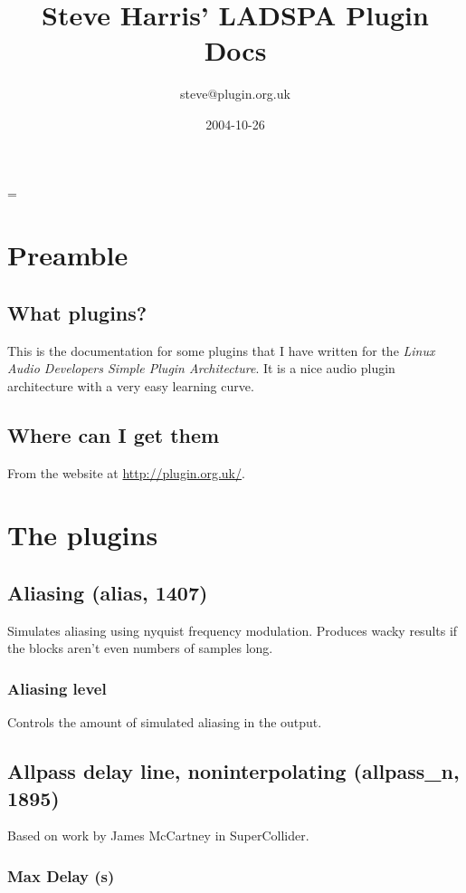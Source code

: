 \documentclass[11pt]{article}
\begin{document}
\title{Steve Harris' LADSPA Plugin Docs}
\date{2004-10-26}
\author{steve@plugin.org.uk}

\maketitle

\tableofcontents{}

\parskip=\medskipamount

\section{Preamble}

\subsection{What plugins?}
This is the documentation for some plugins that I have written for the \emph{Linux Audio Developers Simple Plugin Architecture}. It is a nice audio plugin architecture with a very easy learning curve.

\subsection{Where can I get them}
From the website at \url{http://plugin.org.uk/}.

\section{The plugins}
\subsection{Aliasing (alias, 1407)\label{alias}\label{id1407}}
Simulates aliasing using nyquist frequency modulation. Produces wacky results if the blocks aren't even numbers of samples long.\subsubsection*{Aliasing level}
Controls the amount of simulated aliasing in the output.\subsection{Allpass delay line, noninterpolating (allpass\_n, 1895)\label{allpass_n}\label{id1895}}
Based on work by James McCartney in SuperCollider.\subsubsection*{Max Delay (s)}
\end{document}
